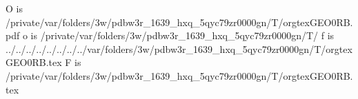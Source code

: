 O is /private/var/folders/3w/pdbw3r_1639_hxq_5qyc79zr0000gn/T/orgtexGEO0RB.pdf
 o is /private/var/folders/3w/pdbw3r_1639_hxq_5qyc79zr0000gn/T/
 f is ../../../../../../../../var/folders/3w/pdbw3r_1639_hxq_5qyc79zr0000gn/T/orgtexGEO0RB.tex
 F is /private/var/folders/3w/pdbw3r_1639_hxq_5qyc79zr0000gn/T/orgtexGEO0RB.tex
